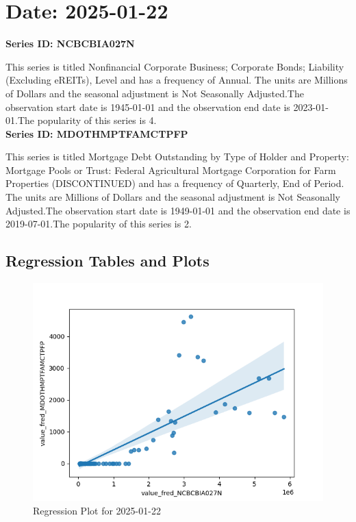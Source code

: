 \section{Date: 2025-01-22}
\noindent \textbf{Series ID: NCBCBIA027N} 

\noindent This series is titled Nonfinancial Corporate Business; Corporate Bonds; Liability (Excluding eREITs), Level and has a frequency of Annual. The units are Millions of Dollars and the seasonal adjustment is Not Seasonally Adjusted.The observation start date is 1945-01-01 and the observation end date is 2023-01-01.The popularity of this series is 4. \\ 

\noindent \textbf{Series ID: MDOTHMPTFAMCTPFP} 

\noindent This series is titled Mortgage Debt Outstanding by Type of Holder and Property: Mortgage Pools or Trust: Federal Agricultural Mortgage Corporation for Farm Properties (DISCONTINUED) and has a frequency of Quarterly, End of Period. The units are Millions of Dollars and the seasonal adjustment is Not Seasonally Adjusted.The observation start date is 1949-01-01 and the observation end date is 2019-07-01.The popularity of this series is 2. \\ 

\subsection{Regression Tables and Plots}


\begin{figure}
\centering
\includegraphics[scale = 0.9]{plots/plot_2025-01-22.png}
\caption{Regression Plot for 2025-01-22}
\end{figure}
\newpage
